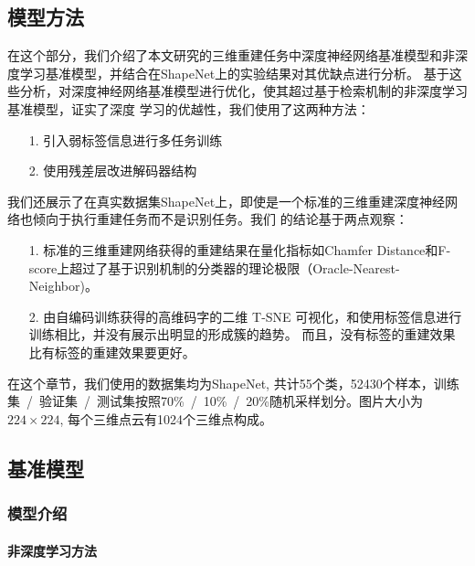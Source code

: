 \documentclass[bachelor, nocolorlinks, printoneside]{seuthesis} %
\begin{document}
\begin{Main}
\chapter{模型方法}
在这个部分，我们介绍了本文研究的三维重建任务中深度神经网络基准模型和非深度学习基准模型，并结合在ShapeNet上的实验结果对其优缺点进行分析。
基于这些分析，对深度神经网络基准模型进行优化，使其超过基于检索机制的非深度学习基准模型，证实了深度
学习的优越性，我们使用了这两种方法：
\begin{itemize}[\hspace{1cm}]
    \item[1.] 引入弱标签信息进行多任务训练
    \item[2.] 使用残差层改进解码器结构
\end{itemize}
我们还展示了在真实数据集ShapeNet上，即使是一个标准的三维重建深度神经网络也倾向于执行重建任务而不是识别任务。我们
的结论基于两点观察：
\begin{itemize}[\hspace{1cm}]
    \item[1.] 标准的三维重建网络获得的重建结果在量化指标如Chamfer Distance和F-score上超过了基于识别机制的分类器的理论极限（Oracle-Nearest-Neighbor)。
    \item[2.] 由自编码训练获得的高维码字的二维 T-SNE 可视化，和使用标签信息进行训练相比，并没有展示出明显的形成簇的趋势。
    而且，没有标签的重建效果比有标签的重建效果要更好。
\end{itemize}

在这个章节，我们使用的数据集均为ShapeNet, 共计55个类，52430个样本，训练集~/~验证集~/~测试集按照70\%~/~10\%~/~20\%随机采样划分。图片大小为$224 \times 224 $,
每个三维点云有1024个三维点构成。


\section{基准模型}
\subsection{模型介绍}
\subsubsection{非深度学习方法}


\end{Main}
\end{document}
